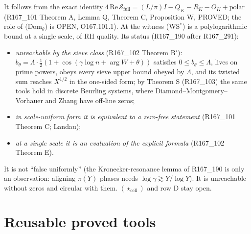 \documentclass[11pt]{amsart}
\theoremstyle{definition}
\theoremstyle{remark}
\begin{document}
\noindent It follows from the exact identity $4\,\mathrm{Re}\,\mathcal S_{\mathrm{full}}=(L/\pi)I-Q_K-R_K-O_K+\text{polar}$ (R167\_101 Theorem A,
Lemma Q, Theorem C, Proposition W, PROVED; the role of (Dom$_\theta$) is OPEN, O167.101.1). At the witness (WS$^*$) is a polylogarithmic bound at a
single scale, of RH quality. Its status (R167\_190 after R167\_291):
\begin{itemize}
\item \emph{unreachable by the sieve class} (R167\_102 Theorem B$'$): $b_\theta=\Lambda\cdot\frac12(1+\cos(\gamma\log n+\arg W+\theta))$ satisfies
$0\le b_\theta\le\Lambda$, lives on prime powers, obeys every sieve upper bound obeyed by $\Lambda$, and its twisted sum reaches $X^{1/2}$ in the
one-sided form; by Theorem S (R167\_103) the same tools hold in discrete Beurling systems, where Diamond--Montgomery--Vorhauer and Zhang have
off-line zeros;
\item \emph{in scale-uniform form it is equivalent to a zero-free statement} (R167\_101 Theorem C; Landau);
\item \emph{at a single scale it is an evaluation of the explicit formula} (R167\_102 Theorem E).
\end{itemize}
It is not ``false uniformly'' (the Kronecker-resonance lemma of R167\_190 is only an observation: aligning $\pi(Y)$ phases needs
$\log\gamma\gtrsim Y/\log Y$). It is unreachable without zeros and circular with them. $(\star_{\mathrm{cell}})$ and row D stay open.

\section{Reusable proved tools}\label{sec:tools}
\end{document}
